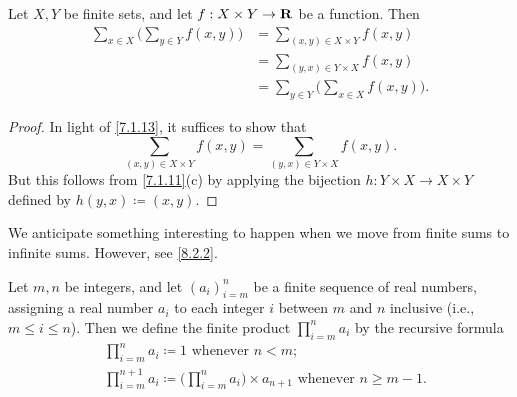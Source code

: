 \begin{corollary}\label{7.1.14}
  Let \(X, Y\) be finite sets, and let \(f : X \times Y \to \mathbf{R}\) be a function.
  Then
  \begin{align*}
    \sum_{x \in X} \bigg(\sum_{y \in Y} f(x, y)\bigg) & = \sum_{(x, y) \in X \times Y} f(x, y)               \\
                                                      & = \sum_{(y, x) \in Y \times X} f(x, y)               \\
                                                      & = \sum_{y \in Y} \bigg(\sum_{x \in X} f(x, y)\bigg).
  \end{align*}
\end{corollary}

\begin{proof}
  In light of \cref{7.1.13}, it suffices to show that
  \[
    \sum_{(x, y) \in X \times Y} f(x, y) = \sum_{(y, x) \in Y \times X} f(x, y).
  \]
  But this follows from \cref{7.1.11}(c) by applying the bijection \(h : Y \times X \to X \times Y\) defined by \(h(y, x) \coloneqq (x, y)\).
\end{proof}

\begin{remark}\label{7.1.15}
  We anticipate something interesting to happen when we move from finite sums to infinite sums.
  However, see \cref{8.2.2}.
\end{remark}

\begin{additional corollary}\label{ac 7.1.1}
Let \(m, n\) be integers, and let \((a_i)_{i = m}^n\) be a finite sequence of real numbers, assigning a real number \(a_i\) to each integer \(i\) between \(m\) and \(n\) inclusive (i.e., \(m \leq i \leq n\)).
Then we define the finite product \(\prod_{i = m}^n a_i\) by the recursive formula
\begin{align*}
   & \prod_{i = m}^n a_i \coloneqq 1 \text{ whenever } n < m;                                                             \\
   & \prod_{i = m}^{n + 1} a_i \coloneqq \Bigg(\prod_{i = m}^n a_i\Bigg) \times a_{n + 1} \text{ whenever } n \geq m - 1.
\end{align*}
\end{additional corollary}

